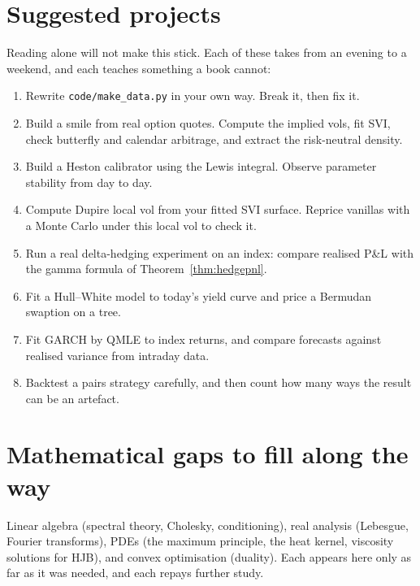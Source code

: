 \section*{Suggested projects}

Reading alone will not make this stick. Each of these takes from an evening to a weekend, and each teaches something a book cannot:
\begin{enumerate}
\item Rewrite \texttt{code/make\_data.py} in your own way. Break it, then fix it.
\item Build a smile from real option quotes. Compute the implied vols, fit SVI, check butterfly and calendar arbitrage, and extract the risk-neutral density.
\item Build a Heston calibrator using the Lewis integral. Observe parameter stability from day to day.
\item Compute Dupire local vol from your fitted SVI surface. Reprice vanillas with a Monte Carlo under this local vol to check it.
\item Run a real delta-hedging experiment on an index: compare realised P\&L with the gamma formula of Theorem~\ref{thm:hedgepnl}.
\item Fit a Hull--White model to today's yield curve and price a Bermudan swaption on a tree.
\item Fit GARCH by QMLE to index returns, and compare forecasts against realised variance from intraday data.
\item Backtest a pairs strategy carefully, and then count how many ways the result can be an artefact.
\end{enumerate}

\section*{Mathematical gaps to fill along the way}

Linear algebra (spectral theory, Cholesky, conditioning), real analysis (Lebesgue, Fourier transforms), PDEs (the maximum principle, the heat kernel, viscosity solutions for HJB), and convex optimisation (duality). Each appears here only as far as it was needed, and each repays further study.
